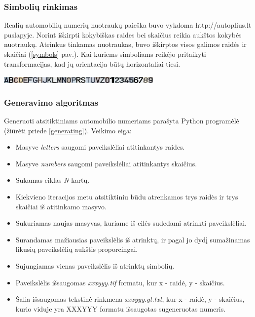 \documentclass{VUMIFInfBakalaurinis}
\begin{document}
\subsubsection{Simbolių rinkimas}
Realių automobilių numerių nuotraukų paieška buvo vykdoma http://autoplius.lt puslapyje.
Norint iškirpti kokybiškas raides bei skaičius reikia aukštos kokybės nuotraukų. 
Atrinkus tinkamas nuotraukas, buvo iškirptos visos galimos raidės ir skaičiai (\ref{symbols} pav.).
Kai kuriems simboliams reikėjo pritaikyti transformacijas, kad jų orientacija būtų horizontaliai tiesi.

\begin{minipage}{\linewidth}
  \includegraphics[width=8cm]{symbols.jpg}
  \label{symbols}
\end{minipage}

\subsubsection{Generavimo algoritmas}
Generuoti atsitiktiniams automobilio numeriams parašyta Python programėlė (žiūrėti priede \ref{generating}).
Veikimo eiga:
\begin{itemize}[itemsep=0.5pt]
  \item Masyve \textit{letters} saugomi paveikslėliai atitinkantys raides.
  \item Masyve \textit{numbers} saugomi paveikslėliai atitinkantys skaičius.
  \item Sukamas ciklas \textit{N} kartų.
  \item Kiekvieno iteracijos metu atsitiktiniu būdu atrenkamos trys raidės ir trys skaičiai iš atitinkamo masyvo.
  \item Sukuriamas naujas masyvas, kuriame iš eilės sudedami atrinkti paveikslėliai.
  \item Surandamas mažiausias paveikslėlis iš atrinktų, ir pagal jo dydį sumažinamas likusių paveikslėlių aukštis proporcingai.
  \item Sujungiamas vienas paveikslėlis iš atrinktų simbolių.
  \item Paveikslėlis išsaugomas \textit{xxxyyy.tif} formatu, kur x - raidė, y - skaičius.
  \item Šalia išsaugomas tekstinė rinkmena \textit{xxxyyy.gt.txt}, kur x - raidė, y - skaičius, kurio viduje yra XXXYYY formatu išsaugotas sugeneruotas numeris.
\end{itemize}
\end{document}

